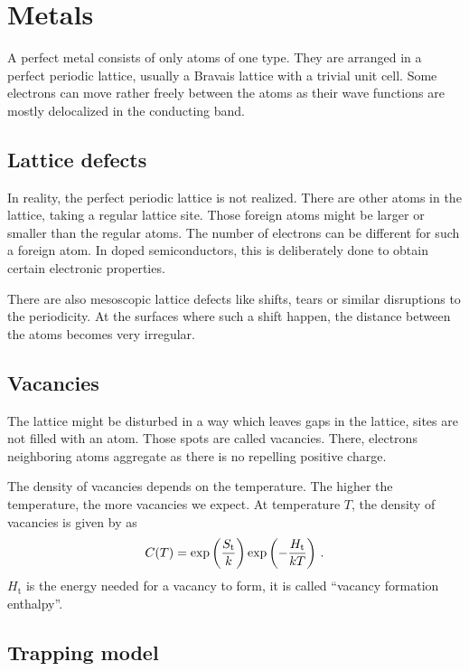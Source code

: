 \documentclass[11pt, english, fleqn, DIV=15, headinclude, BCOR=2cm]{scrreprt}
\begin{document}
\section{Metals}

A perfect metal consists of only atoms of one type. They are arranged in a
perfect periodic lattice, usually a Bravais lattice with a trivial unit cell.
Some electrons can move rather freely between the atoms as their wave functions
are mostly delocalized in the conducting band.

\subsection{Lattice defects}

In reality, the perfect periodic lattice is not realized. There are other atoms
in the lattice, taking a regular lattice site. Those foreign atoms might be
larger or smaller than the regular atoms. The number of electrons can be
different for such a foreign atom. In doped semiconductors, this is
deliberately done to obtain certain electronic properties.

There are also mesoscopic lattice defects like shifts, tears or similar
disruptions to the periodicity. At the surfaces where such a shift happen,
the distance between the atoms becomes very irregular.

\subsection{Vacancies}

The lattice might be disturbed in a way which leaves gaps in the lattice, sites
are not filled with an atom. Those spots are called vacancies. There, electrons
neighboring atoms aggregate as there is no repelling positive charge.

The density of vacancies depends on the temperature. The higher the
temperature, the more vacancies we expect. At temperature $T$, the density of
vacancies is given by \textcite[(3)]{Weiler/Vacancy_formation} as
\[
        C(T) = \exp\left( \frac{S_\text{t}}{k} \right) \exp\left( -\frac{H_\mathrm t}{kT} \right) \,.
\]
$H_\mathrm t$ is the energy needed for a vacancy to form, it is called
\enquote{vacancy formation enthalpy}.

\subsection{Trapping model}
\label{ssec:tra_mod}
\end{document}

